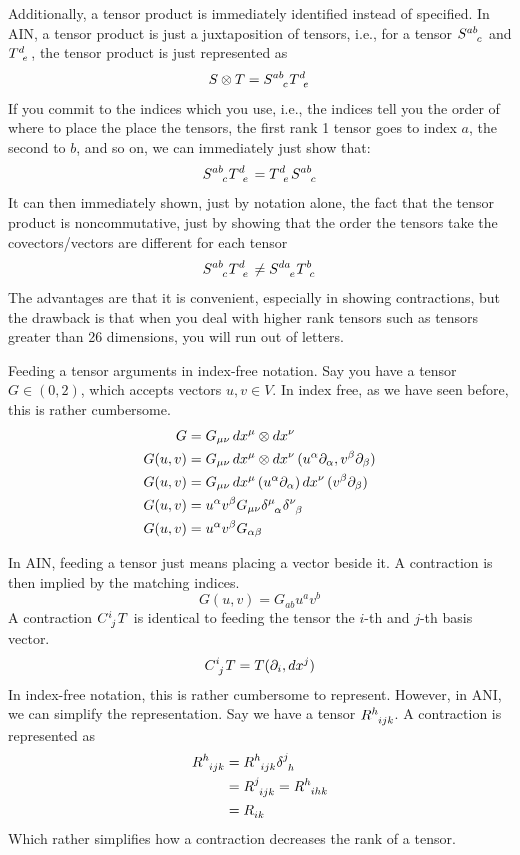 		Additionally, a tensor product is immediately identified instead of specified. In AIN, 
		a tensor product is just a juxtaposition of tensors, i.e., for a tensor $S\indices{^{ab}_c}$ and
		$T\indices{^d_e}$, the tensor product is just represented as
		\[
			S\otimes T = 
			S\indices{^{ab}_c} T\indices{^d_e} 
		\]
		If you commit to the indices which you use, i.e., the indices 
		tell you the order of where to place the place the tensors, the first rank 1 tensor
		goes to index $a$, the second to $b$, and so on, we can immediately just 
		show that:
		\[
			S\indices{^{ab}_c} 
			T\indices{^d_e} 
			=
			T\indices{^d_e} 
			S\indices{^{ab}_c} 
		\]
		It can then immediately shown, just by notation alone, the fact that the tensor product
		is noncommutative, just by showing that the order the tensors take the covectors/vectors
		are different for each tensor
		\[
			S\indices{^{ab}_c} 
			T\indices{^d_e} 
			\neq
			S\indices{^{da}_e} 
			T\indices{^b_c} 
		\]
		The advantages are that it is convenient, especially in showing 
		contractions, but the drawback is that when you deal with higher rank tensors 
		such as tensors greater than 26 dimensions, you will run out of letters.

		Feeding a tensor arguments in index-free notation. Say you have a tensor $G\in(0,2)$,
		which accepts vectors $u,v\in V$. In index free, as we have seen before, this is 
		rather cumbersome. 
		\begin{align*}
			G &= G_{\mu\nu}\dd{x^\mu}\otimes\dd{x^\nu}\\
			G(u,v) &= G_{\mu\nu}\dd{x^\mu}\otimes\dd{x^\nu}(u^\alpha \p_\alpha, v^\beta \p_\beta)\\
			G(u,v) &= G_{\mu\nu}\dd{x^\mu}(u^\alpha \p_\alpha)\dd{x^\nu}(v^\beta \p_\beta)\\
			G(u,v) &= u^\alpha v^\beta G_{\mu\nu}\delta\indices{^\mu_\alpha}\delta\indices{^\nu_\beta}\\
			G(u,v) &= u^\alpha v^\beta G_{\alpha\beta}
		\end{align*}

		In AIN, feeding a tensor just means placing a vector beside it. A contraction is then implied 
		by the matching indices.
		\[
			G(u,v) 
			=
			G_{ab} u^a v^b
		\]
		A contraction $C\indices{^i_j}T$ is identical to feeding the tensor the 
		$i$-th and $j$-th basis vector.
		\[
			C\indices{^i_j} T = T(\p_i, dx^j)
		\]
		In index-free notation, this is rather cumbersome to represent. However, in ANI, we can simplify 
		the representation. Say we have a tensor $R\indices{^h_{ijk}}$. A contraction 
		is represented as
		\begin{align*}
			R\indices{^h_{ijk}} 
			&=
			R\indices{^h_{ijk}} \delta\indices{^j_h}\\
			&=
			R\indices{^j_{ijk}} =  
			R\indices{^h_{ihk}} \\
			&=
			R\indices{_{ik}} 
		\end{align*}
		Which rather simplifies how a contraction decreases the rank of a tensor.	
		\newpage
